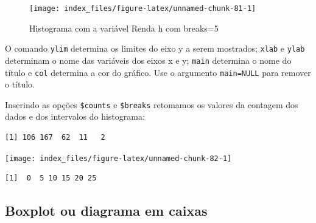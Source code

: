 \documentclass[12pt,brazil,oneside]{book}
\newenvironment{Shaded}{\begin{snugshade}}{\end{snugshade}}
\newcommand{\DataTypeTok}[1]{\textcolor[rgb]{0.13,0.29,0.53}{#1}}
\newcommand{\DecValTok}[1]{\textcolor[rgb]{0.00,0.00,0.81}{#1}}
\newcommand{\KeywordTok}[1]{\textcolor[rgb]{0.13,0.29,0.53}{\textbf{#1}}}
\newcommand{\NormalTok}[1]{#1}
\newcommand{\OperatorTok}[1]{\textcolor[rgb]{0.81,0.36,0.00}{\textbf{#1}}}
\newcommand{\StringTok}[1]{\textcolor[rgb]{0.31,0.60,0.02}{#1}}
\begin{document}
\begin{figure}[H]

{\centering \texttt{[image: index\_files/figure-latex/unnamed-chunk-81-1]} 

}

\caption{Histograma com a variável Renda h com breaks=5}\label{fig:unnamed-chunk-81}
\end{figure}

O comando \texttt{ylim} determina os limites do eixo y a serem mostrados; \texttt{xlab} e \texttt{ylab} determinam o nome das variáveis dos eixos x e y; \texttt{main} determina o nome do título e \texttt{col} determina a cor do gráfico. Use o argumento \texttt{main=NULL} para remover o título.

Inserindo as opções \texttt{\$counts} e \texttt{\$breaks} retomamos os valores da contagem dos dados e dos intervalos do histograma:

\begin{Shaded}
\end{Shaded}

\begin{verbatim}
[1] 106 167  62  11   2
\end{verbatim}

\begin{Shaded}
\end{Shaded}

\begin{center}\texttt{[image: index\_files/figure-latex/unnamed-chunk-82-1]} \end{center}

\begin{verbatim}
[1]  0  5 10 15 20 25
\end{verbatim}

\hypertarget{boxplot-ou-diagrama-em-caixas}{%
\subsection{Boxplot ou diagrama em caixas}\label{boxplot-ou-diagrama-em-caixas}}
\end{document}
